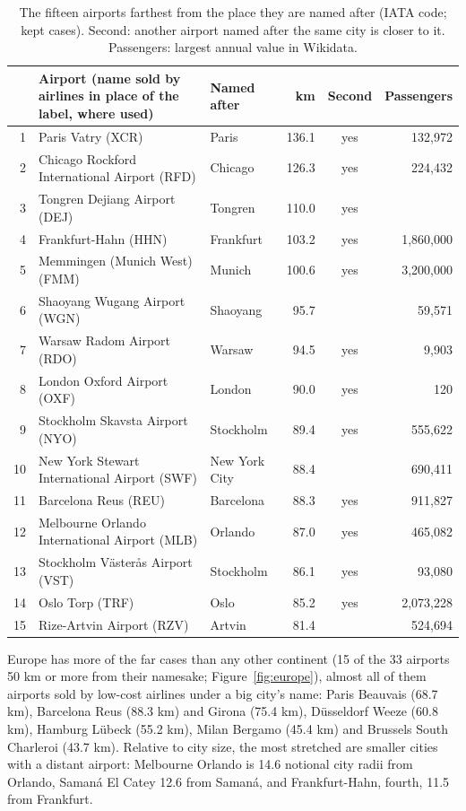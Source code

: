 \documentclass[11pt,a4paper]{article}
\begin{document}
\begin{table}[tbp]\centering\small\caption{The fifteen airports farthest from the place they are named after (IATA code; kept cases). Second: another airport named after the same city is closer to it. Passengers: largest annual value in Wikidata.}\label{tab:world}\begin{tabular}{rp{6.2cm}p{2.8cm}rcr}\toprule & Airport (name sold by airlines in place of the label, where used) & Named after & km & Second & Passengers\\\midrule
1 & Paris Vatry (XCR) & Paris & 136.1 & yes & 132,972\\
2 & Chicago Rockford International Airport (RFD) & Chicago & 126.3 & yes & 224,432\\
3 & Tongren Dejiang Airport (DEJ) & Tongren & 110.0 & yes & \\
4 & Frankfurt-Hahn (HHN) & Frankfurt & 103.2 & yes & 1,860,000\\
5 & Memmingen (Munich West) (FMM) & Munich & 100.6 & yes & 3,200,000\\
6 & Shaoyang Wugang Airport (WGN) & Shaoyang & 95.7 &  & 59,571\\
7 & Warsaw Radom Airport (RDO) & Warsaw & 94.5 & yes & 9,903\\
8 & London Oxford Airport (OXF) & London & 90.0 & yes & 120\\
9 & Stockholm Skavsta Airport (NYO) & Stockholm & 89.4 & yes & 555,622\\
10 & New York Stewart International Airport (SWF) & New York City & 88.4 &  & 690,411\\
11 & Barcelona Reus (REU) & Barcelona & 88.3 & yes & 911,827\\
12 & Melbourne Orlando International Airport (MLB) & Orlando & 87.0 & yes & 465,082\\
13 & Stockholm Västerås Airport (VST) & Stockholm & 86.1 & yes & 93,080\\
14 & Oslo Torp (TRF) & Oslo & 85.2 & yes & 2,073,228\\
15 & Rize-Artvin Airport (RZV) & Artvin & 81.4 &  & 524,694\\
\bottomrule\end{tabular}\end{table}

Europe has more of the far cases than any other continent (15 of the 33 airports 50 km or more from their namesake; Figure~\ref{fig:europe}), almost all of them airports sold by low-cost airlines under a big city's name: Paris Beauvais (68.7 km), Barcelona Reus (88.3 km) and Girona (75.4 km), Düsseldorf Weeze (60.8 km), Hamburg Lübeck (55.2 km), Milan Bergamo (45.4 km) and Brussels South Charleroi (43.7 km). Relative to city size, the most stretched are smaller cities with a distant airport: Melbourne Orlando is 14.6 notional city radii from Orlando, Samaná El Catey 12.6 from Samaná, and Frankfurt-Hahn, fourth, 11.5 from Frankfurt.
\end{document}
